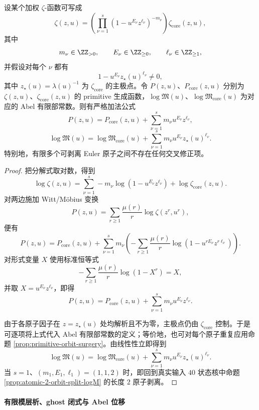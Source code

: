 \begin{theorem}\label{thm:xi-finite-euler-primitive-surgery-additivity}
设某个加权 \(\zeta\)-函数可写成
\[
\zeta(z,u)
=
\left(\prod_{\nu=1}^{s}(1-u^{E_\nu}z^{\ell_\nu})^{-m_\nu}\right)
\zeta_{\mathrm{core}}(z,u),
\]
其中
\[
m_\nu\in\ZZ_{>0},
\qquad
E_\nu\in\ZZ_{\ge 0},
\qquad
\ell_\nu\in\ZZ_{\ge 1},
\]
并假设对每个 \(\nu\) 都有
\[
1-u^{E_\nu}z_\star(u)^{\ell_\nu}\neq 0,
\]
其中 \(z_\star(u)=\lambda(u)^{-1}\) 为 \(\zeta_{\mathrm{core}}\) 的主极点。令 \(P(z,u)\)、\(P_{\mathrm{core}}(z,u)\) 分别为 \(\zeta(z,u)\)、\(\zeta_{\mathrm{core}}(z,u)\) 的 primitive 生成函数，\(\log\mathfrak M(u)\)、\(\log\mathfrak M_{\mathrm{core}}(u)\) 为对应的 Abel 有限部常数。则有严格加法公式
\[
P(z,u)=P_{\mathrm{core}}(z,u)+\sum_{\nu=1}^{s}m_\nu u^{E_\nu}z^{\ell_\nu},
\]
\[
\log\mathfrak M(u)
=
\log\mathfrak M_{\mathrm{core}}(u)
+\sum_{\nu=1}^{s}m_\nu u^{E_\nu}z_\star(u)^{\ell_\nu}.
\]
特别地，有限多个可剥离 Euler 原子之间不存在任何交叉修正项。
\end{theorem}
\begin{proof}
把分解式取对数，得到
\[
\log\zeta(z,u)
=
\sum_{\nu=1}^{s}-m_\nu\log(1-u^{E_\nu}z^{\ell_\nu})
+\log\zeta_{\mathrm{core}}(z,u).
\]
对两边施加 Witt/M\"obius 变换
\[
P(z,u)=\sum_{r\ge 1}\frac{\mu(r)}{r}\log\zeta(z^r,u^r),
\]
便有
\[
P(z,u)
=
P_{\mathrm{core}}(z,u)
+\sum_{\nu=1}^{s}m_\nu
\left(
-\sum_{r\ge 1}\frac{\mu(r)}{r}\log(1-u^{rE_\nu}z^{r\ell_\nu})
\right).
\]
对形式变量 \(X\) 使用标准恒等式
\[
-\sum_{r\ge 1}\frac{\mu(r)}{r}\log(1-X^r)=X,
\]
并取 \(X=u^{E_\nu}z^{\ell_\nu}\)，即得
\[
P(z,u)=P_{\mathrm{core}}(z,u)+\sum_{\nu=1}^{s}m_\nu u^{E_\nu}z^{\ell_\nu}.
\]

由于各原子因子在 \(z=z_\star(u)\) 处均解析且不为零，主极点仍由 \(\zeta_{\mathrm{core}}\) 控制。于是可逐项将上式代入 Abel 有限部常数的定义；等价地，也可对每个原子重复应用命题 \ref{prop:primitive-orbit-surgery}。由线性性立即得到
\[
\log\mathfrak M(u)
=
\log\mathfrak M_{\mathrm{core}}(u)
+\sum_{\nu=1}^{s}m_\nu u^{E_\nu}z_\star(u)^{\ell_\nu}.
\]
当 \(s=1\)、\((m_1,E_1,\ell_1)=(1,1,2)\) 时，即回到真实输入 \(40\) 状态核中命题 \ref{prop:atomic-2-orbit-split-logM} 的长度 \(2\) 原子剥离。
\end{proof}

\paragraph{有限模层析、ghost 闭式与 Abel 位移}

